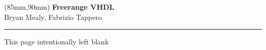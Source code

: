 \documentclass[11pt,b5paper]{book}
\begin{document}


	\thispagestyle{empty}
	\begin{textblock*}{60mm}(85mm,90mm)
	\noindent
	{\sffamily\huge\bfseries Freerange VHDL}\\
	\noindent
	{\sffamily Bryan Mealy, Fabrizio Tappero}\\
	{\color{dark-gray}\rule[5pt]{190pt}{4pt}}
	\end{textblock*}
	\null\newpage

	\thispagestyle{empty}
	

	\thispagestyle{empty}
	\null
	\vspace*{\fill}
	\begin{center}This page intentionally left blank\end{center}
	\vspace*{\fill}
	\newpage

	\thispagestyle{empty}
	\null\newpage

	\setcounter{page}{5}
	\renewcommand\contentsname{Table of Contents} %
	\tableofcontents

	

	\thispagestyle{empty}
	\null\newpage

	

	\setcounter{page}{1}
	
	
	
	
	
	
	
	
	
	
	
	
	
	
\end{document}
